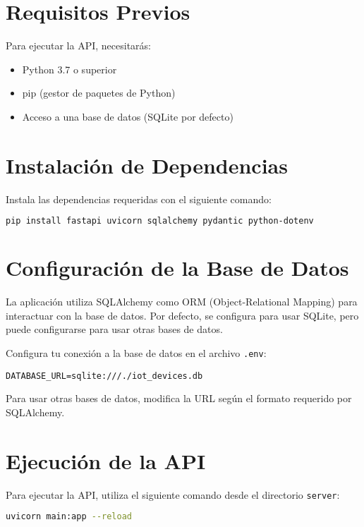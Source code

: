 \documentclass[12pt,letterpaper]{report}
\begin{document}
\section{Requisitos Previos}
Para ejecutar la API, necesitarás:

\begin{itemize}
    \item Python 3.7 o superior
    \item pip (gestor de paquetes de Python)
    \item Acceso a una base de datos (SQLite por defecto)
\end{itemize}

\section{Instalación de Dependencias}
Instala las dependencias requeridas con el siguiente comando:

\begin{lstlisting}[language=bash]
pip install fastapi uvicorn sqlalchemy pydantic python-dotenv
\end{lstlisting}

\section{Configuración de la Base de Datos}
La aplicación utiliza SQLAlchemy como ORM (Object-Relational Mapping) para interactuar con la base de datos. Por defecto, se configura para usar SQLite, pero puede configurarse para usar otras bases de datos.

Configura tu conexión a la base de datos en el archivo \texttt{.env}:

\begin{lstlisting}
DATABASE_URL=sqlite:///./iot_devices.db
\end{lstlisting}

Para usar otras bases de datos, modifica la URL según el formato requerido por SQLAlchemy.

\section{Ejecución de la API}
Para ejecutar la API, utiliza el siguiente comando desde el directorio \texttt{server}:

\begin{lstlisting}[language=bash]
uvicorn main:app --reload
\end{lstlisting}
\end{document}

